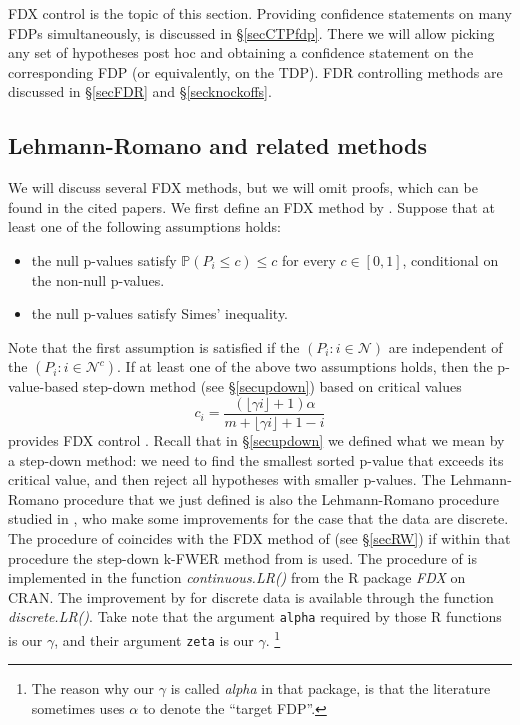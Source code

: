 \documentclass[11pt]{article}
\theoremstyle{plain}
\theoremstyle{definition}
\newcommand{\N}{\mathcal{N}}
\newcommand{\pr}{\mathbb{P}}
\newcommand{\citt}{\citet}
\newcommand{\citp}{\citep}
\begin{document}
FDX control is the topic of this section.
Providing confidence statements on many FDPs simultaneously, is discussed in \S\ref{secCTPfdp}.
There we will allow picking any set of hypotheses post hoc and obtaining a confidence statement on the corresponding FDP (or equivalently, on the TDP). FDR controlling methods are discussed in \S\ref{secFDR} and \S\ref{secknockoffs}.







\subsection{Lehmann-Romano and related methods}
We will discuss several FDX methods, but we will omit proofs, which  can be found in the cited papers. We first define an FDX method by  \citt{lehmann2005generalizations}.
Suppose that at least one of the following assumptions holds: 
\begin{itemize}
\item the null p-values satisfy $\pr(P_i\leq c)\leq c$ for every $c\in[0,1]$, conditional on the non-null p-values.
\item the null p-values satisfy Simes' inequality. 
\end{itemize}
Note that the first assumption is satisfied if the  $(P_i:i\in \N)$ are independent of the $(P_i:i\in \N^c)$.
If at least one of the above two assumptions holds, then  the p-value-based step-down method (see \S\ref{secupdown})  based on critical values 
\begin{equation} \label{eq:LRpowerful}
c_i = \frac{(\lfloor \gamma i \rfloor +1 )\alpha}{m+\lfloor \gamma i \rfloor +1-i }
\end{equation} 
 provides FDX control 
\citp[][p.1148,1150]{lehmann2005generalizations}.
Recall that in \S \ref{secupdown} we defined what we mean by a step-down method: we need to find the smallest sorted p-value that exceeds its critical value, and then reject all hypotheses with smaller p-values.
The Lehmann-Romano procedure that we just defined is also the  Lehmann-Romano procedure studied in \citt{dohler2024FDX}, who make some improvements for the case that the data are discrete.
The procedure of \citt[][pp.1148, 1150]{lehmann2005generalizations} coincides with the FDX method of \citt{romano2007control} (see \S\ref{secRW}) if within that procedure the step-down k-FWER method from 
\citt[][p.1143]{lehmann2005generalizations} is used. The procedure of \citt[][p.1148,1150]{lehmann2005generalizations} is implemented in the function \emph{continuous.LR()}  from  the R package \emph{FDX} on CRAN. The improvement by \citt{dohler2024FDX} for discrete data is available through the function \emph{discrete.LR()}. Take note that the argument \verb|alpha| required by those R functions is our $\gamma$, and their argument \verb|zeta| is our $\gamma$.
\footnote{The reason why our $\gamma$ is called \emph{alpha} in that package, is that the literature sometimes uses $\alpha$ to denote the ``target FDP''.}
\end{document}
